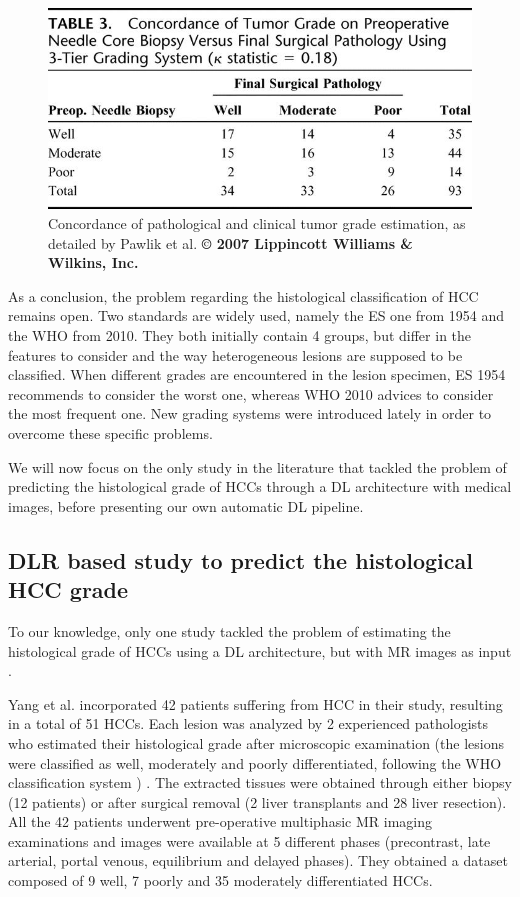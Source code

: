 \begin{figure}[th!]
\centering
\includegraphics[width=0.7\linewidth]{images/pawlik_table3}
\caption{Concordance of pathological and clinical tumor grade estimation, as detailed by Pawlik et al. \textbf{© 2007 Lippincott Williams \& Wilkins, Inc. \cite{Pawlik2007}}}
\label{fig:pawlik_table3}
\end{figure}


As a conclusion, the problem regarding the histological classification
of HCC remains open. Two standards are widely used, namely the ES one
from 1954 and the WHO from 2010. They both initially contain 4 groups,
but differ in the features to consider and the way heterogeneous lesions
are supposed to be classified. When different grades are encountered in
the lesion specimen, ES 1954 recommends to consider the worst one,
whereas WHO 2010 advices to consider the most frequent one. New
grading systems were introduced lately in order to overcome these
specific problems.

We will now focus on the only study in the literature that tackled the
problem of predicting the histological grade of HCCs through a DL
architecture with medical images, before presenting our own automatic DL
pipeline.

\subsection{DLR based study to predict the histological HCC
grade}\label{dlr-based-study-to-predict-the-histological-hcc-grade}

To our knowledge, only one study tackled the problem of estimating the
histological grade of HCCs using a DL architecture, but with MR images
as input \cite{Yang2019}.

Yang et al. incorporated 42 patients suffering from HCC in their study,
resulting in a total of 51 HCCs. Each lesion was analyzed by 2
experienced pathologists who estimated their histological grade after
microscopic examination (the lesions were classified as well, moderately
and poorly differentiated, following the WHO classification system \cite{20113051318}) .
The extracted tissues were obtained through either biopsy (12 patients)
or after surgical removal (2 liver transplants and 28 liver resection).
All the 42 patients underwent pre-operative multiphasic MR imaging
examinations and images were available at 5 different phases
(precontrast, late arterial, portal venous, equilibrium and delayed
phases). They obtained a dataset composed of 9 well, 7 poorly and 35 moderately
differentiated HCCs.

